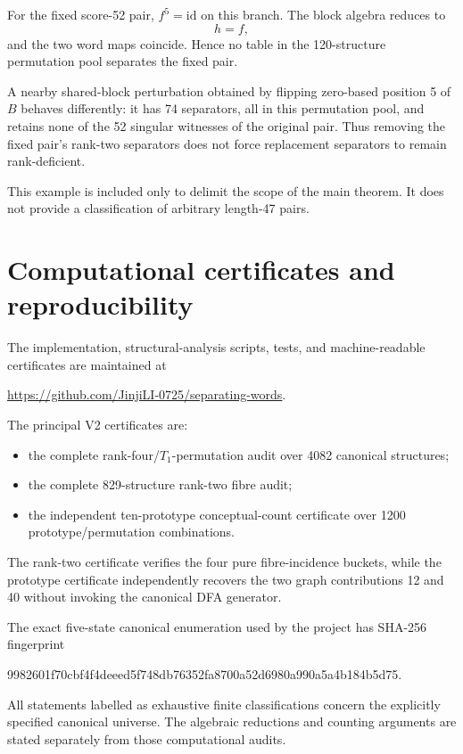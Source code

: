 \documentclass[10pt]{article}
\begin{document}
For the fixed score-52 pair, $f^5=\mathrm{id}$ on this branch. The block algebra reduces to
\[
h=f,
\]
and the two word maps coincide. Hence no table in the 120-structure permutation pool separates the fixed pair.

A nearby shared-block perturbation obtained by flipping zero-based position 5 of $B$ behaves differently: it has 74 separators, all in this permutation pool, and retains none of the 52 singular witnesses of the original pair. Thus removing the fixed pair's rank-two separators does not force replacement separators to remain rank-deficient.

This example is included only to delimit the scope of the main theorem. It does not provide a classification of arbitrary length-47 pairs.

\section{Computational certificates and reproducibility}

The implementation, structural-analysis scripts, tests, and machine-readable certificates are maintained at
\begin{center}
\url{https://github.com/JinjiLI-0725/separating-words}.
\end{center}

The principal V2 certificates are:
\begin{itemize}
\item the complete rank-four/$T_1$-permutation audit over 4082 canonical structures;
\item the complete 829-structure rank-two fibre audit;
\item the independent ten-prototype conceptual-count certificate over 1200 prototype/permutation combinations.
\end{itemize}

The rank-two certificate verifies the four pure fibre-incidence buckets, while the prototype certificate independently recovers the two graph contributions 12 and 40 without invoking the canonical DFA generator.

The exact five-state canonical enumeration used by the project has SHA-256 fingerprint
\begin{center}
\small\ttfamily
9982601f70cbf4f4deeed5f748db76352fa8700a52d6980a990a5a4b184b5d75.
\end{center}

All statements labelled as exhaustive finite classifications concern the explicitly specified canonical universe. The algebraic reductions and counting arguments are stated separately from those computational audits.
\end{document}
